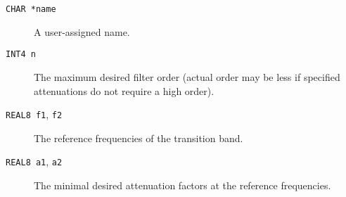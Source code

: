 \begin{description}
\item[\texttt{CHAR *name}] A user-assigned name.

\item[\texttt{INT4 n}] The maximum desired filter order (actual order
  may be less if specified attenuations do not require a high order).

\item[\texttt{REAL8 f1}, \texttt{f2}] The reference frequencies of the
  transition band.

\item[\texttt{REAL8 a1}, \texttt{a2}] The minimal desired attenuation
  factors at the reference frequencies.
\end{description}

\newpage
\newpage

